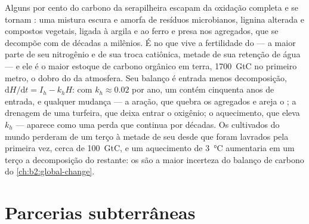 \begin{proposition}\label{prop:b2:living-soil:humus}
Alguns por cento do carbono da serapilheira escapam da oxidação completa
e se tornam \emph{}: uma mistura escura e amorfa de resíduos
microbianos, lignina alterada e compostos vegetais, ligada à argila e ao
ferro e presa nos agregados, que se decompõe com  de
décadas a milênios. É no  que vive a fertilidade do 
--- a maior parte de seu nitrogênio e de sua troca catiônica, metade de
sua retenção de água --- e ele é o maior estoque de carbono orgânico em
terra, \qty{1700}{GtC} no primeiro metro, o dobro do da atmosfera. Seu
balanço é entrada menos decomposição, $\mathrm{d}H/\mathrm{d}t = I_h - k_hH$:
com $k_h \approx 0.02$ por ano, um  contém cinquenta anos de entrada,
e qualquer mudança --- a aração, que quebra os agregados e areja o
; a drenagem de uma turfeira, que deixa entrar o oxigênio; o
aquecimento, que eleva $k_h$ --- aparece como uma perda que continua
por décadas. Os  cultivados do mundo perderam de um terço à metade
de seu  desde que foram lavrados pela primeira vez, cerca de
\qty{100}{GtC}, e um aquecimento de \qty{3}{\celsius} aumentaria em um
terço a decomposição do restante: os  são a maior incerteza do
balanço de carbono do \cref{ch:b2:global-change}.
\end{proposition}

\section{Parcerias subterrâneas}

